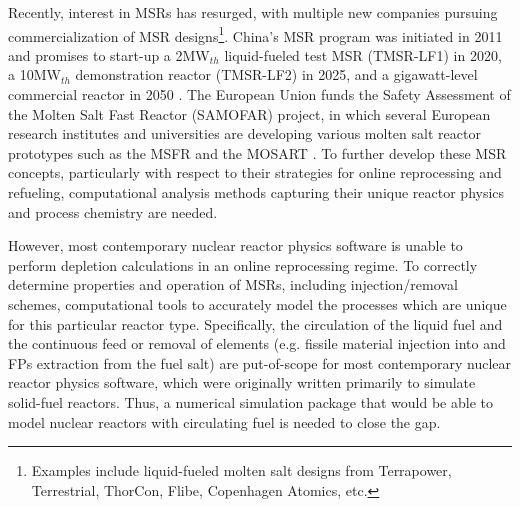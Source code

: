 Recently, interest in \glspl{MSR} has resurged, with multiple new companies 
pursuing commercialization of \gls{MSR} designs\footnote{Examples 
include liquid-fueled molten salt designs from Terrapower, Terrestrial, 
ThorCon, Flibe, Copenhagen Atomics, etc.}. China's \gls{MSR} program 
was initiated in 2011 and promises to start-up a 2MW$_{th}$ 
liquid-fueled test \gls{MSR} (TMSR-LF1) in 2020, a 10MW$_{th}$ 
demonstration reactor (TMSR-LF2) in 2025, and a gigawatt-level 
commercial reactor in 2050 \cite{zhang_review_2018}. The European 
Union funds the Safety Assessment of the Molten Salt Fast Reactor 
(SAMOFAR) project, in which several European research institutes and 
universities are developing various molten salt reactor prototypes 
such as the \gls{MSFR} \cite{fiorina_molten_2013} and the \gls{MOSART} 
\cite{ignatiev_molten_2014}.
To further develop these \gls{MSR} concepts, particularly with respect 
to their strategies for online reprocessing and refueling, 
computational analysis methods capturing their unique reactor physics 
and process chemistry are needed.

However, most contemporary nuclear reactor physics software is unable 
to perform depletion calculations in an online reprocessing regime. 
To correctly determine properties and operation of \glspl{MSR}, 
including injection/removal schemes, computational tools to accurately 
model the processes which are unique for this particular reactor type. Specifically, the circulation of the liquid fuel and the continuous 
feed or removal of elements (e.g. fissile material injection into 
and \glspl{FP} extraction from the fuel salt) are put-of-scope for 
most contemporary nuclear reactor physics software, which were 
originally written primarily to simulate solid-fuel reactors. 
Thus, a numerical simulation package that would be able to model 
nuclear reactors with circulating fuel is needed to close the gap.

